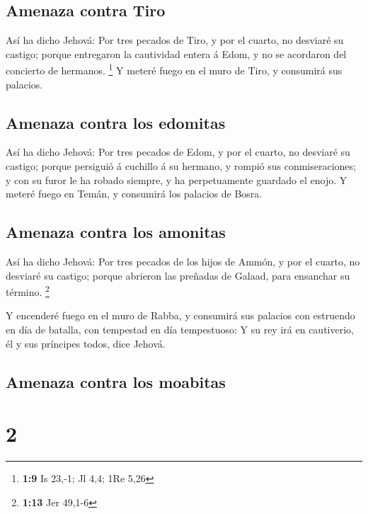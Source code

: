 \hypertarget{amenaza-contra-tiro}{%
\subsection{Amenaza contra Tiro}\label{amenaza-contra-tiro}}

 Así ha dicho Jehová: Por tres pecados de Tiro, y por el
cuarto, no desviaré su castigo; porque entregaron la cautividad entera á
Edom, y no se acordaron del concierto de hermanos. \footnote{\textbf{1:9}
  Is 23,-1; Jl 4,4; 1Re 5,26}  Y meteré fuego en el muro de
Tiro, y consumirá sus palacios.

\hypertarget{amenaza-contra-los-edomitas}{%
\subsection{Amenaza contra los
edomitas}\label{amenaza-contra-los-edomitas}}

 Así ha dicho Jehová: Por tres pecados de Edom, y por el
cuarto, no desviaré su castigo; porque persiguió á cuchillo á su
hermano, y rompió sus conmiseraciones; y con su furor le ha robado
siempre, y ha perpetuamente guardado el enojo.  Y meteré
fuego en Temán, y consumirá los palacios de Bosra.

\hypertarget{amenaza-contra-los-amonitas}{%
\subsection{Amenaza contra los
amonitas}\label{amenaza-contra-los-amonitas}}

 Así ha dicho Jehová: Por tres pecados de los hijos de
Ammón, y por el cuarto, no desviaré su castigo; porque abrieron las
preñadas de Galaad, para ensanchar su término. \footnote{\textbf{1:13}
  Jer 49,1-6}

 Y encenderé fuego en el muro de Rabba, y consumirá sus
palacios con estruendo en día de batalla, con tempestad en día
tempestuoso:  Y su rey irá en cautiverio, él y sus
príncipes todos, dice Jehová.

\hypertarget{amenaza-contra-los-moabitas}{%
\subsection{Amenaza contra los
moabitas}\label{amenaza-contra-los-moabitas}}

\hypertarget{section-1}{%
\section{2}\label{section-1}}

